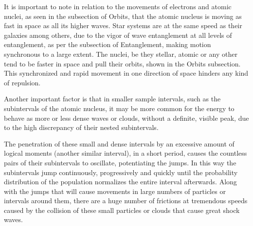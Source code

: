 It is important to note in relation to the movements of electrons and atomic nuclei, as seen in the subsection of Orbits, that the atomic nucleus is moving as fast in space as all its higher waves. Star systems are at the same speed as their galaxies among others, due to the vigor of wave entanglement at all levels of entanglement, as per the subsection of Entanglement, making motion synchronous to a large extent. The nuclei, be they stellar, atomic or any other tend to be faster in space and pull their orbits, shown in the Orbits subsection. This synchronized and rapid movement in one direction of space hinders any kind of repulsion.

Another important factor is that in smaller sample intervals, such as the subintervals of the atomic nucleus, it may be more common for the energy to behave as more or less dense waves or clouds, without a definite, visible peak, due to the high discrepancy of their nested subintervals.

The penetration of these small and dense intervals by an excessive amount of logical moments (another similar interval), in a short period, causes the countless pairs of their subintervals to oscillate, potentiating the jumps. In this way the subintervals jump continuously, progressively and quickly until the probability distribution of the population normalizes the entire interval afterwards. Along with the jumps that will cause movements in large numbers of particles or intervals around them, there are a huge number of frictions at tremendous speeds caused by the collision of these small particles or clouds that cause great shock waves.

